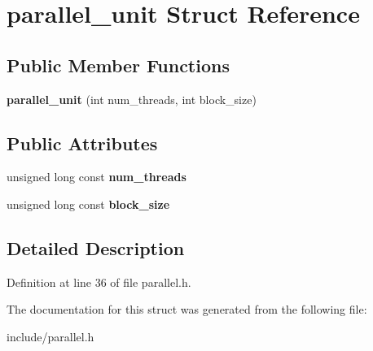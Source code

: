 \hypertarget{structparallel__unit}{\section{parallel\+\_\+unit Struct Reference}
\label{structparallel__unit}
}
\subsection*{Public Member Functions}
\begin{DoxyCompactItemize}
\item 
\hypertarget{structparallel__unit_ac3495a97bd966af2ad90086f3275f2ae}{{\bfseries parallel\+\_\+unit} (int num\+\_\+threads, int block\+\_\+size)}\label{structparallel__unit_ac3495a97bd966af2ad90086f3275f2ae}

\end{DoxyCompactItemize}
\subsection*{Public Attributes}
\begin{DoxyCompactItemize}
\item 
\hypertarget{structparallel__unit_a8ea0f9485577952020e0f3f6eef09fc5}{unsigned long const {\bfseries num\+\_\+threads}}\label{structparallel__unit_a8ea0f9485577952020e0f3f6eef09fc5}

\item 
\hypertarget{structparallel__unit_aa81409ba06ec5eaf58e18088b66a61c6}{unsigned long const {\bfseries block\+\_\+size}}\label{structparallel__unit_aa81409ba06ec5eaf58e18088b66a61c6}

\end{DoxyCompactItemize}


\subsection{Detailed Description}


Definition at line 36 of file parallel.\+h.



The documentation for this struct was generated from the following file\+:\begin{DoxyCompactItemize}
\item 
include/parallel.\+h\end{DoxyCompactItemize}
